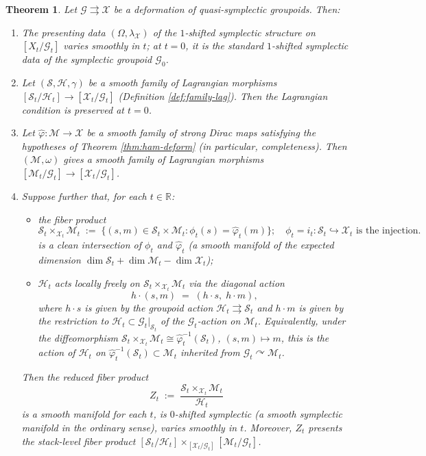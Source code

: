 \documentclass[reqno]{amsart}
\theoremstyle{plain}
\newtheorem{Thm}{Theorem}[section]
\theoremstyle{definition}
\newcommand{\G}{\mathcal{G}}
\renewcommand{\H}{\mathcal{H}}
\renewcommand{\S}{\mathcal{S}}
\newcommand{\M}{\mathcal{M}}
\newcommand{\X}{\mathcal{X}}
\begin{document}
\begin{Thm}\label{thm:shifted}
Let $\G \rightrightarrows \X$ be a deformation of quasi-symplectic groupoids. Then:
\begin{enumerate}
  \item The presenting data $(\Omega, \lambda_\X)$ of the $1$-shifted symplectic structure on $[X_t / \G_t]$ varies smoothly in $t$; at $t = 0$, it is the standard $1$-shifted symplectic data of the symplectic groupoid $\G_0$.
  \item Let $(\S, \H, \gamma)$ be a smooth family of Lagrangian morphisms $[\S_t / \H_t] \to [\X_t / \G_t]$ (Definition \ref{def:family-lag}). Then the Lagrangian condition is preserved at $t = 0$.
  \item Let $\hat\varphi \colon \M \to \X$ be a smooth family of strong Dirac maps satisfying the hypotheses of Theorem \ref{thm:ham-deform} (in particular, completeness). Then $(\M, \omega)$ gives a smooth family of Lagrangian morphisms $[\M_t / \G_t] \to [\X_t / \G_t]$.
  \item Suppose further that, for each $t \in \mathbb{R}$:
  \begin{itemize}
    \item the fiber product
    \[
      \S_t \times_{\X_t} \M_t \;:=\; \{(s,m)\in \S_t\times \M_t : \phi_t(s)=\hat\varphi_t(m)\}; \quad \phi_t = i_t: \S_t \hookrightarrow \X_t \text{ is the injection}.
    \]
    is a clean intersection of $\phi_t$ and $\hat\varphi_t$  (a smooth manifold of the expected dimension
    $\dim \S_t+\dim \M_t-\dim \X_t$);
    \item $\H_t$ acts locally freely on $\S_t\times_{\X_t}\M_t$ via the
    \emph{diagonal action}
    \[
      h\cdot(s,m)\;=\;(h\cdot s,\;h\cdot m),
    \]
    where $h\cdot s$ is given by the groupoid action $\H_t\rightrightarrows \S_t$
    and $h\cdot m$ is given by the restriction to $\H_t\subset
    \G_t|_{\S_t}$ of the $\G_t$-action on $\M_t$.
    Equivalently, under the diffeomorphism $\S_t\times_{\X_t}\M_t\cong
    \hat\varphi_t^{-1}(\S_t)$, $(s,m)\mapsto m$, this is the action of
    $\H_t$ on $\hat\varphi_t^{-1}(\S_t)\subset \M_t$ inherited from
    $\G_t\curvearrowright \M_t$.
  \end{itemize}
  Then the reduced fiber product
  \[
    Z_t \;:=\; \frac{\S_t\times_{\X_t}\M_t}{\H_t}
  \]
  is a smooth manifold for each $t$, is $0$-shifted symplectic
  (a smooth symplectic manifold in the ordinary sense), varies smoothly in $t$. Moreover, $Z_t$ presents the stack-level fiber
  product $[\S_t/\H_t]\times_{[\X_t/\G_t]}[\M_t/\G_t]$.
\end{enumerate}
\end{Thm}
\end{document}
